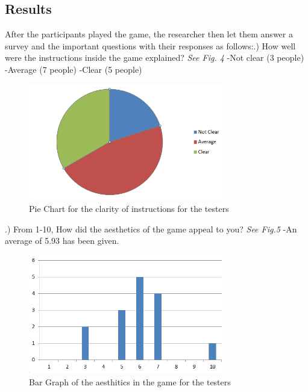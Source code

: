 \documentclass[journal]{./IEEE/IEEEtran}
\begin{document}
\begin{justify}
\section{\textbf{Results}}
After the participants played the game, the researcher then let them answer a survey and the important questions with their responses as follows:\newline {}.)	How well were the instructions inside the game explained? \textit{See Fig. 4}\newline
-Not clear (3 people)\newline
-Average (7 people)\newline
-Clear (5 people)
\begin{figure}[ht]
   \includegraphics[width = 8.5cm]{images/pie}
   \caption{Pie Chart for the clarity of instructions for the testers}
   \label{4}
\end{figure}
\newline
\newline
{}.) From 1-10, How did the aesthetics of the game appeal to you? \textit{See Fig.5}\newline
-An average of 5.93 has been given.
\begin{figure}[ht]
   \includegraphics[width = 8.5cm]{images/bar3}
   \caption{Bar Graph of the aesthitics in the game for the testers}
   \label{5}
\end{figure}
\newline

\end{justify}
\end{document}
